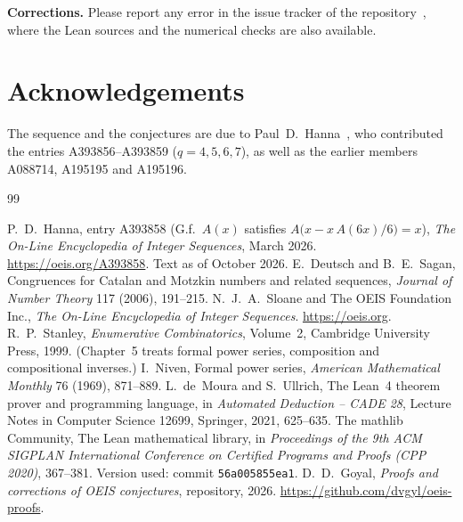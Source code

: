 \documentclass[11pt,a4paper]{article}
\theoremstyle{definition}
\theoremstyle{remark}
\newcommand{\para}[1]{\par\medskip\noindent\textbf{#1}\enspace}
\begin{document}
\para{Corrections.} Please report any error in the issue tracker of the repository~\cite{repo}, where the Lean sources and the numerical checks are also
available.

\section*{Acknowledgements}
The sequence and the conjectures are due to Paul~D.~Hanna~\cite{oeis}, who contributed
the entries A393856--A393859 ($q=4,5,6,7$), as well as the earlier members A088714, A195195 and A195196.

\begin{thebibliography}{99}\small
\raggedright
{} P.~D.~Hanna, entry A393858 (G.f.\ $A(x)$ satisfies $A\bigl(x-x\,A(6x)/6\bigr)=x$), \emph{The On-Line Encyclopedia of Integer Sequences}, March 2026. \url{https://oeis.org/A393858}. Text as of October 2026.
 E.~Deutsch and B.~E.~Sagan, Congruences for Catalan and Motzkin numbers and related sequences, \emph{Journal of Number Theory} 117 (2006), 191--215.
 N.~J.~A.~Sloane and The OEIS Foundation Inc., \emph{The On-Line Encyclopedia of Integer Sequences}. \url{https://oeis.org}.
 R.~P.~Stanley, \emph{Enumerative Combinatorics}, Volume~2, Cambridge University Press, 1999. (Chapter~5 treats formal power series, composition and compositional inverses.)
 I.~Niven, Formal power series, \emph{American Mathematical Monthly} 76 (1969), 871--889.
 L.~de~Moura and S.~Ullrich, The Lean~4 theorem prover and programming language, in \emph{Automated Deduction -- CADE 28}, Lecture Notes in Computer Science 12699, Springer, 2021, 625--635.
 The mathlib Community, The Lean mathematical library, in \emph{Proceedings of the 9th ACM SIGPLAN International Conference on Certified Programs and Proofs (CPP 2020)}, 367--381. Version used: commit \texttt{56a005855ea1}.
 D.~D.~Goyal, \emph{Proofs and corrections of OEIS conjectures}, repository, 2026. \url{https://github.com/dvgyl/oeis-proofs}.
\end{thebibliography}
\end{document}
